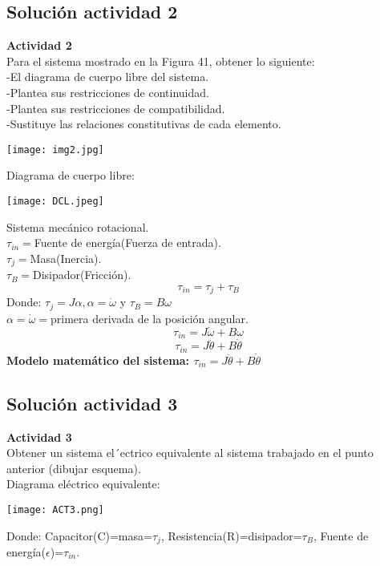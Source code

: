 \subsection{Solución actividad 2}
\noindent \textbf{Actividad 2}\\
Para el sistema mostrado en la Figura 41, obtener lo siguiente:\\
-El diagrama de cuerpo libre del sistema.\\
-Plantea sus restricciones de continuidad.\\
-Plantea sus restricciones de compatibilidad.\\
-Sustituye las relaciones constitutivas de cada elemento.\\

\begin{center}
\texttt{[image: img2.jpg]} 
\end{center}

Diagrama de cuerpo libre:\\
\begin{center}
\texttt{[image: DCL.jpeg]} \\
\end{center}
Sistema mecánico rotacional.\\
$\tau_{in}=$Fuente de energía(Fuerza de entrada).\\
$\tau_{j}=$Masa(Inercia).\\
$\tau_{B}=$Disipador(Fricción).\\
$$\tau_{in}=\tau_{j}+\tau_{B}$$
Donde: $\tau_{j}=J\alpha,\alpha=\dot{\omega}$ y $\tau_{B}=B\omega$\\
$\alpha=\dot{\omega}=$primera derivada de la posición angular.
$$\tau_{in}=J\dot{\omega}+B\omega$$
$$\tau_{in}=J\ddot{\theta}+B\dot{\theta}$$
\textbf{Modelo matemático del sistema: $\tau_{in}=J\ddot{\theta}+B\dot{\theta}$}\\

\begin{center}
\end{center}


\subsection{Solución actividad 3}
\noindent \textbf{Actividad 3}\\
Obtener un sistema el´ectrico equivalente al sistema trabajado en el punto anterior (dibujar esquema).\\

Diagrama eléctrico equivalente:\\
\begin{center}
\texttt{[image: ACT3.png]} 
\end{center}
Donde: Capacitor(C)=masa=$\tau_{j}$, Resistencia(R)=disipador=$\tau_{B}$, Fuente de energía($\epsilon$)=$\tau_{in}$.


